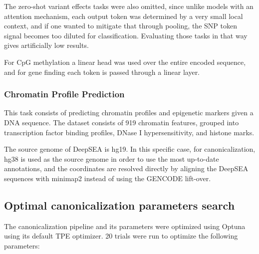 \documentclass[   ]{article}
\begin{document}
The zero-shot variant effects tasks were also omitted, since unlike
models with an attention mechanism, each output token was determined by
a very small local context, and if one wanted to mitigate that through
pooling, the SNP token signal becomes too diluted for classification.
Evaluating those tasks in that way gives artificially low results.

For CpG methylation a linear head was used over the entire encoded
sequence, and for gene finding each token is passed through a linear
layer.

\subsubsection{Chromatin Profile Prediction}
This task \citep{zhouPredictingEffectsNoncoding2015} consists of predicting
chromatin profiles and epigenetic markers given a DNA sequence. The
dataset consists of 919 chromatin features, grouped into transcription
factor binding profiles, DNase I hypersensitivity, and histone marks.

The source genome of DeepSEA is hg19. In this specific case, for
canonicalization, hg38 is used as the source genome in order to use the
most up-to-date annotations, and the coordinates are resolved directly
by aligning the DeepSEA sequences with minimap2
\citep{liMinimap2PairwiseAlignment2018} instead of using the GENCODE
lift-over.

\subsection{Optimal canonicalization parameters search}
\label{sec:methods_optimal_canonicalization_search}

The canonicalization pipeline and its parameters were optimized using Optuna \citep{akibaOptunaNextgenerationHyperparameter2019} using its default TPE optimizer. 20 trials were run to optimize the following parameters:
\end{document}
